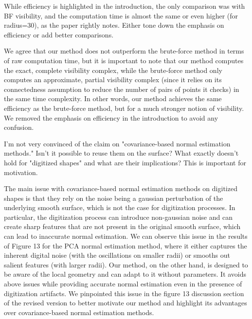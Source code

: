 \documentclass[10pt,french]{letter}
\begin{document}
  \begin{remark}
    While efficiency is highlighted in the introduction, the only comparison was
    with BF visibility, and the computation time is almost the same or even higher
    (for radius=30), as the paper rightly notes. Either tone down the emphasis on
    efficiency or add better comparisons.
  \end{remark}
  \begin{response}
    We agree that our method does not outperform the brute-force method in terms of
    raw computation time, but it is important to note that our method computes the
    exact, complete visibility complex, while the brute-force method only
    computes an approximate, partial visibility complex (since it relies on
    its connectedness assumption to reduce the number of pairs of points it checks)
    in the same time complexity. In other words, our method achieves the same efficiency
    as the brute-force method, but for a much stronger notion of visibility. We
    removed the emphasis on efficiency in the introduction to avoid any confusion.
  \end{response}

  \begin{remark}
    I'm not very convinced of the claim on "covariance-based normal estimation
    methods." Isn't it possible to reuse them on the surface? What exactly doesn't
    hold for "digitized shapes" and what are their implications? This is important
    for motivation.
  \end{remark}
  \begin{response}
    The main issue with covariance-based normal estimation methods on digitized shapes is that they rely
    on the noise being a gaussian perturbation of the underlying smooth surface, which is not the case
    for digitization processes. In particular, the digitization process can introduce non-gaussian noise
    and can create sharp features that are not present in the original smooth surface, which can lead to
    inaccurate normal estimation. We can observe this issue in the results of Figure 13 for the PCA normal
    estimation method, where it either captures the inherent digital noise (with the oscillations on
    smaller radii) or smooths out salient features (with larger radii). Our method, on the other hand,
    is designed to be aware of the local geometry and can adapt to it without parameters. It avoids
    above issues while providing accurate normal estimation even in the presence of digitization artifacts.
    We pinpointed this issue in the figure 13 discussion section of the revised version to better motivate
    our method and highlight its advantages over covariance-based normal estimation methods.
  \end{response}
\end{document}
